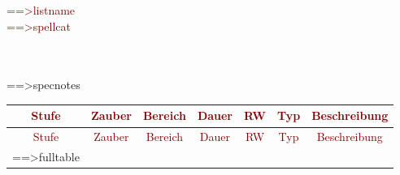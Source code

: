 \begin{center}
\begin{commentbox}
\begin{center}
\textcolor{Maroon}{\Huge ==>listname}\\
\textcolor{Maroon}{\Large ==>spellcat}
\end{center}
\\
\\
==>specnotes
\end{commentbox}
{\fontsize{8}{10}\selectfont
\begin{longtable}{p{1cm}p{3cm}p{1.5cm}p{1.5cm}p{1cm}p{1cm}p{6cm}}

\multicolumn{1}{c}{\textcolor{Maroon}{Stufe}} & \multicolumn{1}{c}{\textcolor{Maroon}{Zauber}} & \multicolumn{1}{c}{\textcolor{Maroon}{Bereich}} & \multicolumn{1}{c}{\textcolor{Maroon}{Dauer}} & \multicolumn{1}{c}{\textcolor{Maroon}{RW}} & \multicolumn{1}{c}{\textcolor{Maroon}{Typ}} & \multicolumn{1}{c}{\textcolor{Maroon}{Beschreibung}}  \\ \hline
\endfirsthead

\multicolumn{1}{c}{\textcolor{Maroon}{Stufe}} & \multicolumn{1}{c}{\textcolor{Maroon}{Zauber}} & \multicolumn{1}{c}{\textcolor{Maroon}{Bereich}} & \multicolumn{1}{c}{\textcolor{Maroon}{Dauer}} & \multicolumn{1}{c}{\textcolor{Maroon}{RW}} & \multicolumn{1}{c}{\textcolor{Maroon}{Typ}} & \multicolumn{1}{c}{\textcolor{Maroon}{Beschreibung}}  \\
\hline
\endhead

\endfoot

\endlastfoot
\hline
==>fulltable
\end{longtable}
}
\end{center}
\newpage
